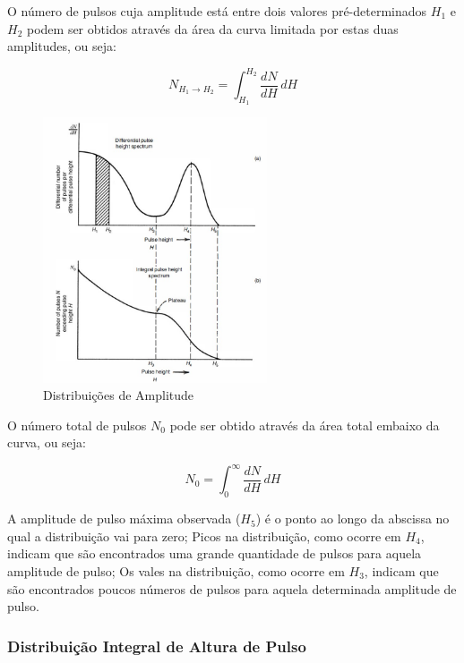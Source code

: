 \documentclass[11pt,a4paper]{article}
\begin{document}
			O número de pulsos cuja amplitude está entre dois valores pré-determinados $H_1$ e $H_2$ podem ser obtidos através da área da curva limitada por estas duas amplitudes, ou seja:

				\begin{equation}
					N_{H_1 \rightarrow  H_2} = \int_{H_1}^{H_2} \frac{dN}{dH}  \,dH 
				\end{equation}

				\begin{figure}[h]
					\centering
					\includegraphics[width=0.59\textwidth]{Imagens/distribuicaoDeAlturaDePulso.jpg}
					\caption{Distribuições de Amplitude}
					\label{fig:distribuicaoDeAlturaDePulso}
				\end{figure}

			O número total de pulsos $N_0$ pode ser obtido através da área total embaixo da curva, ou seja:

				\begin{equation}
					N_0 = \int_{0}^{\infty} \frac{dN}{dH} \,dH
				\end{equation}

			A amplitude de pulso máxima observada ($H_5$) é o ponto ao longo da abscissa no qual a distribuição vai para zero; Picos na distribuição, como ocorre em $H_4$, indicam que são encontrados uma grande quantidade de pulsos para aquela amplitude de pulso; Os vales na distribuição, como ocorre em $H_3$, indicam que são encontrados poucos números de pulsos para aquela determinada amplitude de pulso. 

\subsubsection*{Distribuição Integral de Altura de Pulso}
\end{document}

